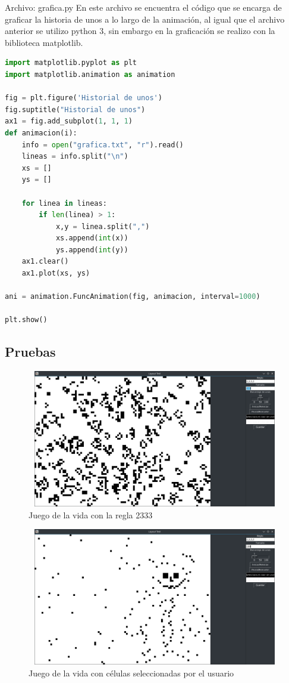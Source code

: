 Archivo: grafica.py
En este archivo se encuentra el código que se encarga de graficar la historia de unos a lo largo de la animación, al igual que el archivo anterior se utilizo python 3, sin embargo en la graficación se realizo con la biblioteca matplotlib.
\begin{lstlisting}[language=Python]
import matplotlib.pyplot as plt
import matplotlib.animation as animation

fig = plt.figure('Historial de unos')
fig.suptitle("Historial de unos")
ax1 = fig.add_subplot(1, 1, 1)
def animacion(i):
    info = open("grafica.txt", "r").read()
    lineas = info.split("\n")
    xs = []
    ys = []

    for linea in lineas:
        if len(linea) > 1:
            x,y = linea.split(",")
            xs.append(int(x))
            ys.append(int(y))
    ax1.clear()
    ax1.plot(xs, ys)

ani = animation.FuncAnimation(fig, animacion, interval=1000)

plt.show()
\end{lstlisting}

\subsection{Pruebas}

\begin{figure}[H]
\begin{center}
 \includegraphics[width=13cm, height=6cm]{./img/gol.png}
 \caption{Juego de la vida con la regla 2333}
 \label{fig:gol}
\end{center}
\end{figure}

\begin{figure}[H]
\begin{center}
 \includegraphics[width=13cm, height=6cm]{./img/gol_celulas.png}
 \caption{Juego de la vida con células seleccionadas por el usuario}
 \label{fig:gol_celulas}
\end{center}
\end{figure}

